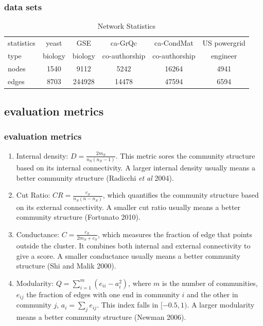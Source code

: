 \documentclass{beamer}
\begin{document}
\begin{frame}
\frametitle{data sets}
\begin{table}[ht]
	\caption{Network Statistics}
	\begin{center}
		\begin{tabular}{l|c|c|c|c|c}
			\hline
			statistics & yeast & GSE & ca-GrQc & ca-CondMat & US powergrid \\
			type & biology & biology & co-authorship & co-authorship & engineer \\
			nodes & 1540 & 9112 & 5242 & 16264 & 4941 \\
			edges & 8703 & 244928 & 14478 & 47594 & 6594 \\
			\hline
		\end{tabular}
	\end{center}
	\label{table:networks}
\end{table}
\end{frame}

\subsection{evaluation metrics}
\begin{frame}
\frametitle{evaluation metrics}
\begin{enumerate}
	\item Internal density: $D=\frac{2m_S}{n_S(n_S-1)}$. This metric sores the community structure based on its internal connectivity. A larger internal density usually means a better community structure (Radicchi \textit{et al} 2004).
	\item Cut Ratio: $CR=\frac{c_S}{n_S(n-n_S)}$, which quantifies the community structure based on its external connectivity. A smaller cut ratio usually means a better community structure (Fortunato 2010).
	\item Conductance: $C=\frac{c_S}{2m_S+c_S}$, which measures the fraction of edge that points outside the cluster. It combines both internal and external connectivity to give a score. A smaller conductance usually means a better community structure (Shi and Malik 2000).
	\item Modularity: $Q=\sum_{i=1}^{m}(e_{ii}-a_i^2)$, where $m$ is the number of communities, $e_{ij}$ the fraction of edges with one end in community $i$ and the other in community $j$, $a_i =\sum_je_{ij}$. This index falls in $[-0.5, 1)$. A larger modularity means a better community structure (Newman 2006). 
\end{enumerate}
\end{frame}
\end{document}
